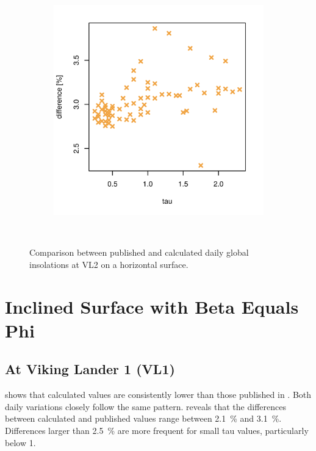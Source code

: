 \begin{figure}[H]
\begin{subfigure}[t]{\subfigureWidth}
            \includegraphics[height=\graphicsHeight]{sections/appendix/insolation-calculation-verification/plots/hh-diff-bet-exp-calc-at-vl2.png}
            \label{fig:sub:comparative-global-insolation-at-vl2-horizontal-percentage-differences}
    \end{subfigure}\\[0.8ex]
    \caption{Comparison between published and calculated daily global insolations at \ac{VL2} on a horizontal surface.}
    \label{fig:plot:comparative-global-insolation-at-vl2-horizontal}
\vspace{-2ex}
\end{figure}

\section{Inclined Surface with Beta Equals Phi}
\subsection{At Viking Lander 1 (VL1)}
 shows that calculated values are consistently lower than those published in . Both daily variations closely follow the same pattern.  reveals that the differences between calculated and published values range between \SI{2.1}{\percent} and \SI{3.1}{\percent}. Differences larger than \SI{2.5}{\percent} are more frequent for small tau values, particularly below 1.

